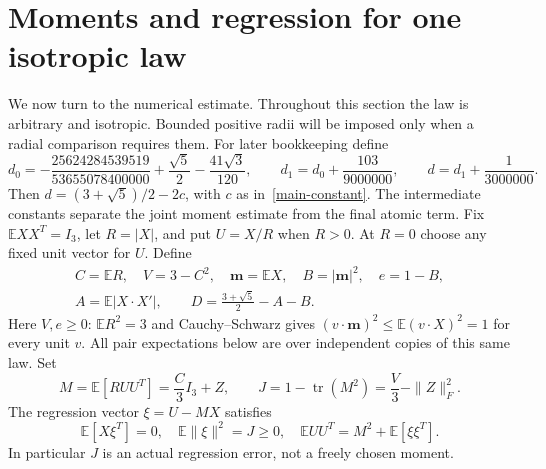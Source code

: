 \documentclass[11pt]{article}
\theoremstyle{remark}\newtheorem{remark}[theorem]{Remark}
\newcommand{\E}{\mathbb E}
\DeclareMathOperator{\tr}{tr}
\numberwithin{equation}{section}
\begin{document}
\section{Moments and regression for one isotropic law}\label{sec-moments}
We now turn to the numerical estimate. Throughout this section the law
is arbitrary and isotropic. Bounded positive radii will be imposed only
when a radial comparison requires them. For later bookkeeping define
\begin{equation}\label{constants}
 d_0=-\frac{25624284539519}{53655078400000}
                  +\frac{\sqrt5}{2}-\frac{41\sqrt3}{120},\qquad
 d_1=d_0+\frac{103}{9000000},\qquad
 d=d_1+\frac1{3000000}.
\end{equation}
Then $d=(3+\sqrt5)/2-2c$, with $c$ as in~\eqref{main-constant}.
The intermediate constants separate the joint moment estimate from
the final atomic term.
Fix $\E XX^T=I_3$, let $R=|X|$, and put $U=X/R$ when $R>0$.
At $R=0$ choose any fixed unit vector for $U$. Define
\[
 \begin{gathered}
 C=\E R,\quad V=3-C^2,\quad \mathbf m=\E X,\quad B=|\mathbf m|^2,\quad e=1-B,\\
 A=\E|X\cdot X'|,\qquad D=\frac{3+\sqrt5}{2}-A-B.
 \end{gathered}
\]
Here $V,e\ge0$: $\E R^2=3$ and Cauchy--Schwarz gives
$(v\cdot \mathbf m)^2\le\E(v\cdot X)^2=1$ for every unit $v$.
All pair expectations below are over independent copies of this same law.
Set
\[
 M=\E[R UU^T]=\frac C3I_3+Z,\qquad
 J=1-\tr(M^2)=\frac V3-\|Z\|_F^2.
\]
The regression vector $\xi=U-MX$ satisfies
\begin{equation}\label{regression}
 \E[X\xi^T]=0,\quad \E\|\xi\|^2=J\ge0,\quad
 \E UU^T=M^2+\E[\xi\xi^T].
\end{equation}
In particular $J$ is an actual regression error, not a freely chosen moment.
\end{document}
